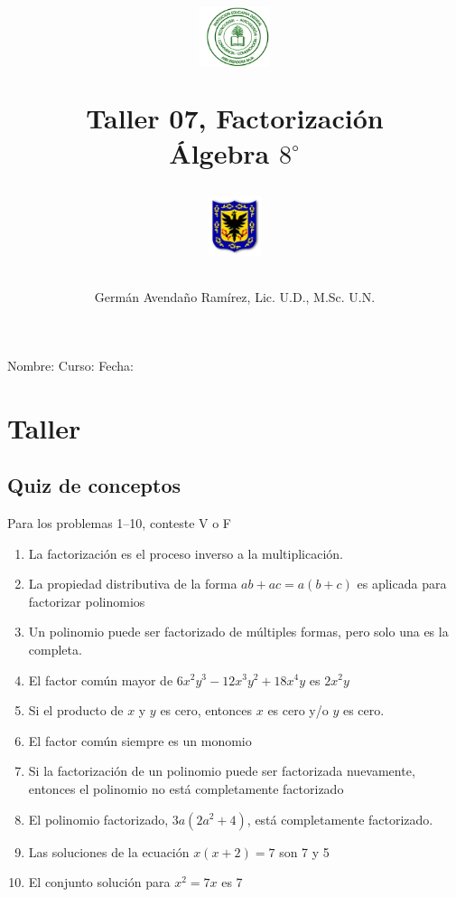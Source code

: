 \documentclass[10pt,twoside]{article}
\author{Germ\'an Avenda\~no Ram\'irez, Lic. U.D., M.Sc. U.N.}
\title{\begin{minipage}{.2\textwidth}
\includegraphics[height=1.75cm]{Images/logo-colegio.png}\end{minipage}
\begin{minipage}{.55\textwidth}
\begin{center}
Taller 07, Factorización  \\
Álgebra $8^{\circ}$
\end{center}
\end{minipage}\hfill
\begin{minipage}{.2\textwidth}
\includegraphics[height=1.75cm]{Images/logo-sed.png} 
\end{minipage}}
\date{}
\begin{document}
\maketitle
Nombre: \hrulefill Curso: \underline{\hspace*{44pt}} Fecha: \underline{\hspace*{2.5cm}}
\section*{Taller}
\subsection*{Quiz de conceptos}
Para los problemas 1--10, conteste V o F
\begin{enumerate}
\item La factorizaci\'{o}n es el proceso inverso a la multiplicaci\'{o}n.
\item La propiedad distributiva de la forma $ab+ac=a(b+c)$ es aplicada para factorizar polinomios
\item Un polinomio puede ser factorizado de m\'{u}ltiples formas, pero solo una es la completa.
\item El factor común mayor de $6x^{2}y^{3}-12x^{3}y^{2}+18x^{4}y$ es $2x^{2}y$
\item Si el producto de $x$ y $y$ es cero, entonces $x$ es cero y/o $y$ es cero.
\item El factor común siempre es un monomio
\item Si la factorización de un polinomio puede ser factorizada nuevamente, entonces el polinomio no está completamente factorizado
\item El polinomio factorizado, $3a(2a^{2}+4)$, está completamente factorizado.
\item Las soluciones de la ecuación $x(x+2)=7$ son 7 y 5
\item El conjunto solución para $x^{2}=7x$ es 7
\end{enumerate}
\end{document}
